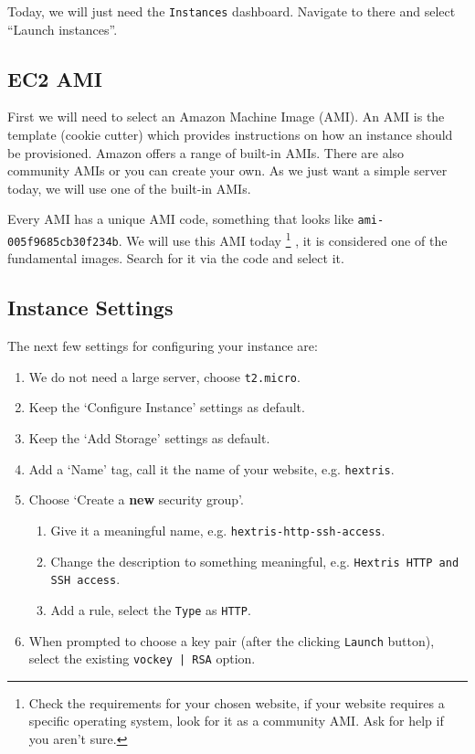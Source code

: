 \documentclass{csse4400}
\begin{document}
Today, we will just need the \texttt{Instances} dashboard.
Navigate to there and select ``Launch instances''.

\subsection{EC2 AMI}
First we will need to select an Amazon Machine Image (AMI).
An AMI is the template (cookie cutter) which provides instructions on how an instance should be provisioned.
Amazon offers a range of built-in AMIs. There are also community AMIs or you can create your own.
As we just want a simple server today, we will use one of the built-in AMIs.

Every AMI has a unique AMI code, something that looks like \texttt{ami-005f9685cb30f234b}.
We will use this AMI today%
\footnote{Check the requirements for your chosen website, if your website requires a specific operating system, look for it as a community AMI.
Ask for help if you aren't sure.}
, it is considered one of the fundamental images.
Search for it via the code and select it.


\subsection{Instance Settings}
The next few settings for configuring your instance are:
\begin{enumerate}
\item We do not need a large server, choose \texttt{t2.micro}.
\item Keep the `Configure Instance' settings as default.
\item Keep the `Add Storage' settings as default.
\item Add a `Name' tag, call it the name of your website, e.g. \texttt{hextris}.
\item Choose `Create a \textbf{new} security group'.
\begin{enumerate}
\item Give it a meaningful name, e.g. \texttt{hextris-http-ssh-access}.
\item Change the description to something meaningful, e.g. \texttt{Hextris HTTP and SSH access}.
\item Add a rule, select the \texttt{Type} as \texttt{HTTP}.
\end{enumerate}
\item When prompted to choose a key pair (after the clicking \texttt{Launch} button), select the existing \texttt{vockey | RSA} option.
\end{enumerate}
\end{document}

